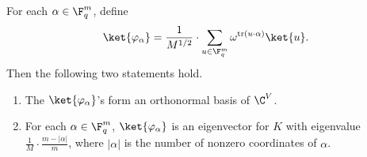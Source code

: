\begin{lemma}\label{prop:eigenvectors}
	\leanok
	For each $\alpha \in \F_q^m$, define
	\[
		\ket{\varphi_\alpha}
		=
		\frac{1}{M^{1/2}} \cdot \sum_{u \in \F_q^m} \omega^{\operatorname{tr}(u\cdot \alpha)} \ket{u}.
	\]
	Then the following two statements hold.
	\begin{enumerate}
		\item The $\ket{\varphi_\alpha}$'s form an orthonormal basis of $\C^V$.\label{item:orthonormal}
		\item For each $\alpha \in \F_q^m$, $\ket{\varphi_\alpha}$ is an eigenvector for $K$ with eigenvalue $\frac{1}{M} \cdot \frac{m-|\alpha|}{m}$, where $|\alpha|$ is the number of nonzero coordinates of $\alpha$.\label{item:eigenvector}
	\end{enumerate}
\end{lemma}
